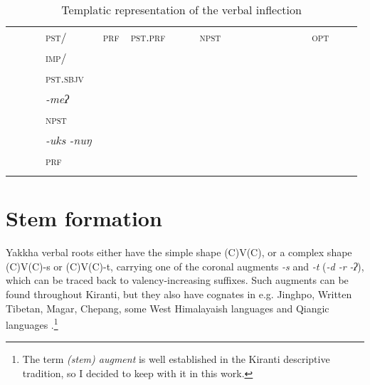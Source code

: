 \begin{landscape}
\begin{table}[p]
{\begin{tabular}{lllllllllllllllllll}
	&										&			&	\scshape pst/&				\scshape prf&				\scshape pst.prf&			&						&						\scshape npst&			&				&			&				&				&			&				&					\scshape opt&		&				\\
	&										&			&	\scshape imp/&				&						&						&						&						&					&				&			&				&				&			&				&					&				&				\\
	&										&			&	\scshape pst.sbjv&			&						&						&						&						&					&				&			&				&				&			&				&					&				&				\\
	&										&			&	\emph{-meʔ}&			&						&						&						&						&					&				&			&				&				&			&				&					&				&				\\
	&										&			&	\scshape npst&				&						&						&						&						&					&				&			&				&				&			&				&					&				&				\\
	&										&			&	\emph{-uks\,\ti\,-nuŋ}&	&						&						&						&						&					&				&			&				&				&			&				&					&				&				\\
	&										&			&	\scshape prf&				&						&						&						&						&					&				&			&				&				&			&				&					&				&				\\
	\lspbottomrule																																																																																		
\end{tabular}
}
\caption{Templatic representation of the verbal inflection}\label{xyz}
\end{table} 


\end{landscape}


\pagestyle{scrheadings}

\section{Stem formation}\label{stem}

Yakkha verbal roots either have the simple shape (C)V(C), or a complex shape (C)V(C)-s or (C)V(C)-t, carrying one of the coronal augments  \emph{-s} and \emph{-t} (\emph{\ti -d \ti -r \ti -ʔ}), which can be traced back to valency-increasing suffixes. Such augments can be found throughout Kiranti, but they also have cognates in e.g. Jinghpo, Written Tibetan, Magar, Chepang, some West Himalayaish languages and Qiangic languages \citep[457--59]{Matisoff2003Handbook}.\footnote{The term \emph{(stem) augment} is well established in the Kiranti descriptive tradition, so I decided to keep with it in this work.} 

